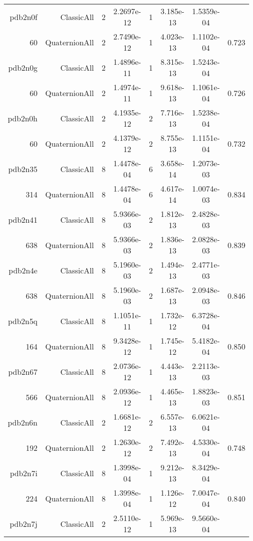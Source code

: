 \begin{xltabular}{\textwidth}{r|rcS[table-format=1.4e+2]cS[table-format=1.3e+2]S[table-format=1.4e+2]S[table-format=-1.3]}
pdb2n0f & ClassicAll & 2 & 2.2697e-12 & 1 & 3.185e-13 & 1.5359e-04 & \\
60 & QuaternionAll & 2 & 2.7490e-12 & 1 & 4.023e-13 & 1.1102e-04 & 0.723\\  \addlinespace
pdb2n0g & ClassicAll & 2 & 1.4896e-11 & 1 & 8.315e-13 & 1.5243e-04 & \\
60 & QuaternionAll & 2 & 1.4974e-11 & 1 & 9.618e-13 & 1.1061e-04 & 0.726\\  \addlinespace
pdb2n0h & ClassicAll & 2 & 4.1935e-12 & 2 & 7.716e-13 & 1.5238e-04 & \\
60 & QuaternionAll & 2 & 4.1379e-12 & 2 & 8.755e-13 & 1.1151e-04 & 0.732\\  \addlinespace
pdb2n35 & ClassicAll & 8 & 1.4478e-04 & 6 & 3.658e-14 & 1.2073e-03 & \\
314 & QuaternionAll & 8 & 1.4478e-04 & 6 & 4.617e-14 & 1.0074e-03 & 0.834\\  \addlinespace
pdb2n41 & ClassicAll & 8 & 5.9366e-03 & 2 & 1.812e-13 & 2.4828e-03 & \\
638 & QuaternionAll & 8 & 5.9366e-03 & 2 & 1.836e-13 & 2.0828e-03 & 0.839\\  \addlinespace
pdb2n4e & ClassicAll & 8 & 5.1960e-03 & 2 & 1.494e-13 & 2.4771e-03 & \\
638 & QuaternionAll & 8 & 5.1960e-03 & 2 & 1.687e-13 & 2.0948e-03 & 0.846\\  \addlinespace
pdb2n5q & ClassicAll & 8 & 1.1051e-11 & 1 & 1.732e-12 & 6.3728e-04 & \\
164 & QuaternionAll & 8 & 9.3428e-12 & 1 & 1.745e-12 & 5.4182e-04 & 0.850\\  \addlinespace
pdb2n67 & ClassicAll & 8 & 2.0736e-12 & 1 & 4.443e-13 & 2.2113e-03 & \\
566 & QuaternionAll & 8 & 2.0936e-12 & 1 & 4.465e-13 & 1.8823e-03 & 0.851\\  \addlinespace
pdb2n6n & ClassicAll & 2 & 1.6681e-12 & 2 & 6.557e-13 & 6.0621e-04 & \\
192 & QuaternionAll & 2 & 1.2630e-12 & 2 & 7.492e-13 & 4.5330e-04 & 0.748\\  \addlinespace
pdb2n7i & ClassicAll & 8 & 1.3998e-04 & 1 & 9.212e-13 & 8.3429e-04 & \\
224 & QuaternionAll & 8 & 1.3998e-04 & 1 & 1.126e-12 & 7.0047e-04 & 0.840\\  \addlinespace
pdb2n7j & ClassicAll & 2 & 2.5110e-12 & 1 & 5.969e-13 & 9.5660e-04 & \\

\end{xltabular}
